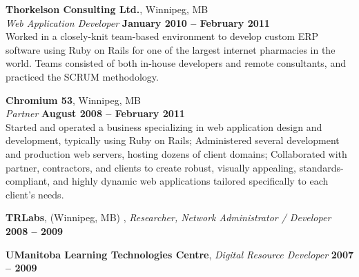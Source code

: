 \documentclass[margin,line,letterpaper]{resume}
\begin{document}
\begin{resume}
  {\bf Thorkelson Consulting Ltd.}, Winnipeg, MB \vspace{2mm}\\\vspace{1mm}%
  {\sl Web Application Developer} \hfill {\bf January 2010 -- February 2011}\\
  Worked in a closely-knit team-based environment to develop custom
  ERP software using Ruby on Rails for one of the largest internet pharmacies in the
  world. Teams consisted of both in-house developers and remote
  consultants, and practiced the SCRUM methodology.

  {\bf Chromium 53}, Winnipeg, MB \vspace{2mm}\\\vspace{1mm}%
  {\sl Partner} \hfill {\bf August 2008 -- February 2011}\\
  Started and operated a business specializing in web application design and development, 
  typically using Ruby on Rails; Administered several development and production web servers,
  hosting dozens of client domains; Collaborated with partner, contractors, and clients to create
  robust, visually appealing, standards-compliant, and highly dynamic web applications tailored  
  specifically to each client's needs.

  {\bf TRLabs}, (Winnipeg, MB) , {\sl  Researcher, Network Administrator / Developer} \hfill {\bf 2008 -- 2009}


  {\bf UManitoba Learning Technologies Centre}, {\sl Digital Resource Developer} \hfill {\bf 2007 -- 2009}



\end{resume}
\end{document}

